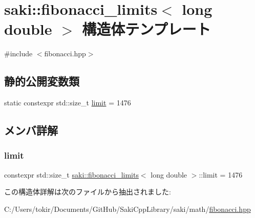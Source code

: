 \hypertarget{structsaki_1_1fibonacci__limits_3_01long_01double_01_4}{}\section{saki\+:\+:fibonacci\+\_\+limits$<$ long double $>$ 構造体テンプレート}
\label{structsaki_1_1fibonacci__limits_3_01long_01double_01_4}


{\ttfamily \#include $<$fibonacci.\+hpp$>$}

\subsection*{静的公開変数類}
\begin{DoxyCompactItemize}
\item 
static constexpr std\+::size\+\_\+t \mbox{\hyperlink{structsaki_1_1fibonacci__limits_3_01long_01double_01_4_a8e282bac966b4230161c94086f2c0a32}{limit}} = 1476
\end{DoxyCompactItemize}


\subsection{メンバ詳解}
\mbox{\label{structsaki_1_1fibonacci__limits_3_01long_01double_01_4_a8e282bac966b4230161c94086f2c0a32}} 
\subsubsection{\texorpdfstring{limit}{limit}}
{\footnotesize\ttfamily constexpr std\+::size\+\_\+t \mbox{\hyperlink{structsaki_1_1fibonacci__limits}{saki\+::fibonacci\+\_\+limits}}$<$ long double $>$\+::limit = 1476\hspace{0.3cm}{\ttfamily [static]}}



この構造体詳解は次のファイルから抽出されました\+:\begin{DoxyCompactItemize}
\item 
C\+:/\+Users/tokir/\+Documents/\+Git\+Hub/\+Saki\+Cpp\+Library/saki/math/\mbox{\hyperlink{fibonacci_8hpp}{fibonacci.\+hpp}}\end{DoxyCompactItemize}
